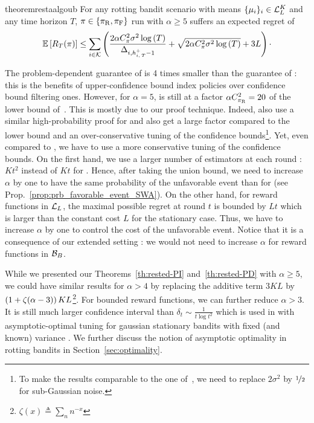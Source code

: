 \begin{restatable}{theorem}{restaalgoub}\label{th:rested-PD}
For any rotting bandit scenario with means $\{\mu_i\}_{i} \in \mathcal{L}_L^K$ and any time horizon $T$, $\pi \in \left\{\pi_{\rm R}, \pi_{\rm F} \right\}$ run with $\alpha \geq 5$ suffers an expected regret of
\begin{align*}
\mathbb{E}\left[R_T(\pi)\right]  \leq \sum_{i\in \mathcal{K}} \left(\frac{2\alpha C_\pi^2\sigma^2\log\left(T\right)}{\Delta_{i,h_{i,\,T}^+-1}} + \sqrt{2\alpha C_\pi^2\sigma^2\log\left(T\right)} +3L \right) \cdot
\end{align*}
\end{restatable}
\begin{remark}
\label{rem:pd-optimality}
The problem-dependent guarantee of \RUCB is 4 times smaller than the guarantee of \FEWA : this is the benefits of upper-confidence bound index policies over confidence bound filtering ones. However, for $\alpha = 5$, \RUCB is still at a factor $\alpha C_{\pi_{\rm R}}^2 = 20$ of the lower bound of~\citet{lai1985asymptotically}. This is mostly due to our proof technique. Indeed, \citet{auer2002finite} also use a similar high-probability proof for \UCBone and also get a large factor compared to the lower bound and an over-conservative tuning of the confidence bounds\footnote{To make the results comparable to the one of~\citet{auer2002finite}, we need to replace $2\sigma^2$ by $\nicefrac{1}{2}$ for sub-Gaussian noise.}. Yet, even compared to \UCBone, we have to use a more conservative tuning of the confidence bounds. On the first hand, we use a larger number of estimators at each round : $Kt^2$ instead of $Kt$ for \UCB. Hence, after taking the union bound, we need to increase $\alpha$ by one to have the same probability of the unfavorable event than for \UCBone (see Prop.~\ref{prop:prb_favorable_event_SWA}). On the other hand, for reward functions in $\mathcal{L}_L$, the maximal possible regret at round $t$ is bounded by $Lt$ which is larger than the constant cost $L$ for the stationary case. Thus, we have to increase $\alpha$ by one to control the cost of the unfavorable event. Notice that it is a consequence of our extended setting : we would not need to increase $\alpha$ for reward functions in $\mathcal{B}_{B}$.

While we presented our Theorems~\ref{th:rested-PI} and~\ref{th:rested-PD} with $\alpha \geq 5$, we could have similar results for $\alpha > 4$ by replacing the additive term $3KL$ by $\left(1 + \zeta(\alpha-3)\right)KL$\footnote{$\zeta(x) \triangleq \sum_n n^{-x}$}. For bounded reward functions, we can further reduce $\alpha >3$. It is still much larger confidence interval than $\delta_t \sim \frac{1}{t\log{t}^2}$ which is used in \UCB with asymptotic-optimal tuning for gaussian stationary bandits with fixed (and known) variance \citep{lattimore2019bandit}. We further discuss the notion of asymptotic optimality in rotting bandits in Section~\ref{sec:optimality}.
\end{remark}



